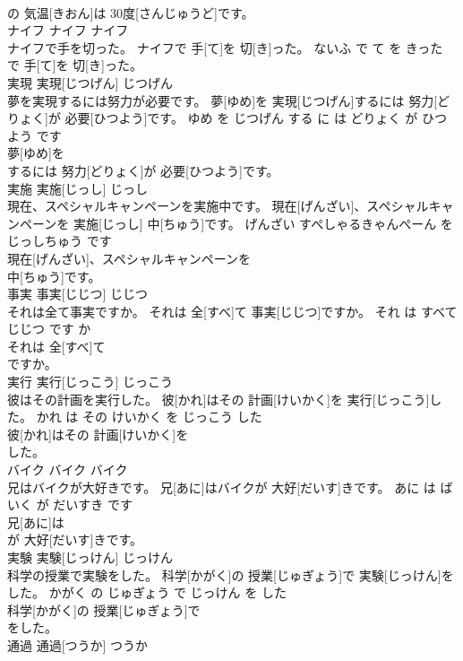 \documentclass[8pt]{extreport}
\begin{document}
\begin{CJK}{UTF8}{min}
\\	の 気温[きおん]は 30度[さんじゅうど]です。		
\\	ナイフ	ナイフ	ナイフ	
\\	ナイフで手を切った。	ナイフで 手[て]を 切[き]った。	ないふ で て を きった	
\\	で 手[て]を 切[き]った。		
\\	実現	実現[じつげん]	じつげん	
\\	夢を実現するには努力が必要です。	夢[ゆめ]を 実現[じつげん]するには 努力[どりょく]が 必要[ひつよう]です。	ゆめ を じつげん する に は どりょく が ひつよう です	
\\	夢[ゆめ]を
\\	するには 努力[どりょく]が 必要[ひつよう]です。		
\\	実施	実施[じっし]	じっし	
\\	現在、スペシャルキャンペーンを実施中です。	現在[げんざい]、スペシャルキャンペーンを 実施[じっし] 中[ちゅう]です。	げんざい すぺしゃるきゃんぺーん を じっしちゅう です	
\\	現在[げんざい]、スペシャルキャンペーンを
\\	中[ちゅう]です。		
\\	事実	事実[じじつ]	じじつ	
\\	それは全て事実ですか。	それは 全[すべ]て 事実[じじつ]ですか。	それ は すべて じじつ です か	
\\	それは 全[すべ]て
\\	ですか。		
\\	実行	実行[じっこう]	じっこう	
\\	彼はその計画を実行した。	彼[かれ]はその 計画[けいかく]を 実行[じっこう]した。	かれ は その けいかく を じっこう した	
\\	彼[かれ]はその 計画[けいかく]を
\\	した。		
\\	バイク	バイク	バイク	
\\	兄はバイクが大好きです。	兄[あに]はバイクが 大好[だいす]きです。	あに は ばいく が だいすき です	
\\	兄[あに]は
\\	が 大好[だいす]きです。		
\\	実験	実験[じっけん]	じっけん	
\\	科学の授業で実験をした。	科学[かがく]の 授業[じゅぎょう]で 実験[じっけん]をした。	かがく の じゅぎょう で じっけん を した	
\\	科学[かがく]の 授業[じゅぎょう]で
\\	をした。		
\\	通過	通過[つうか]	つうか	

\end{CJK}
\end{document}
